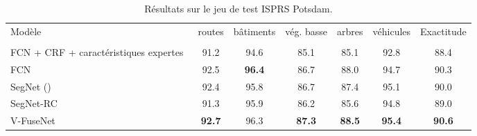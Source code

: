 \begin{table}
    \caption{Résultats sur le jeu de test \gls{ISPRS} Potsdam.}
    \label{table:final_potsdam}
    \setlength\tabcolsep{4pt}
	\begin{tabularx}{\textwidth}{Y c c c c c c}
    \toprule
  	Modèle & routes & bâtiments & vég. basse & arbres & véhicules & Exactitude\\\\
    \midrule
    FCN + CRF + caractéristiques expertes~\cite{liu_dense_2017} & 91.2 & 94.6 & 85.1 & 85.1 & 92.8 & 88.4\\
    FCN~\cite{sherrah_fully_2016} & 92.5 & \textbf{96.4} & 86.7 & 88.0 & 94.7 & 90.3\\
    \midrule
    SegNet () & 92.4 & 95.8 & 86.7 & 87.4 & 95.1 & 90.0\\
	  SegNet-RC & 91.3 & 95.9 & 86.2 & 85.6 & 94.8 & 89.0\\
    V-FuseNet & \textbf{92.7} & 96.3 & \textbf{87.3} & \textbf{88.5} & \textbf{95.4} & \textbf{90.6}\\
    \bottomrule
    \end{tabularx}
\end{table}


